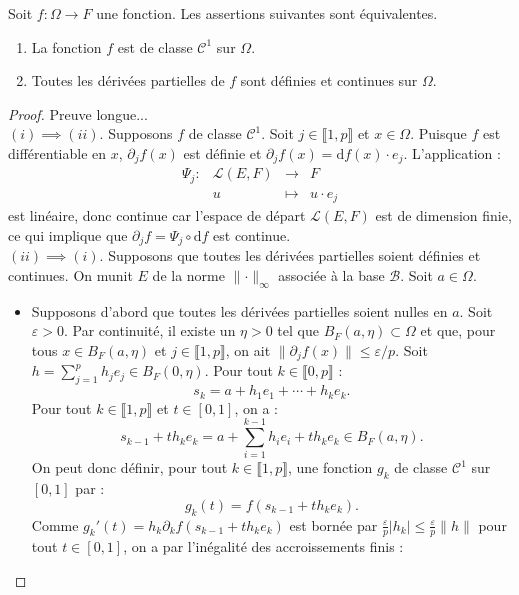 \documentclass[french]{article}
\renewcommand{\d}{\text{d}}
\theoremstyle{plain}
\theoremstyle{definition}
\theoremstyle{remark}
\begin{document}
\begin{thm}%
	Soit $f:\Omega\to F$ une fonction. Les assertions suivantes sont équivalentes.
	\begin{enumerate}[label=(\roman*)]
		\item La fonction $f$ est de classe $\mathcal{C}^1$ sur $\Omega$.
		\item Toutes les dérivées partielles de $f$ sont définies et continues sur $\Omega$.
	\end{enumerate}
\end{thm}
\begin{proof}
	Preuve longue...\\
	$(i)\implies(ii)$.
	Supposons $f$ de classe $\mathcal{C}^1$. Soit $j\in\llbracket1,p\rrbracket$ et $x\in\Omega$. Puisque $f$ est différentiable en $x$, $\partial_jf(x)$ est définie et $\partial_jf(x)=\d f(x)\cdot e_j$. L'application :
	$$\begin{array}{lrcl}
		\Psi_j:&\mathcal{L}(E,F)&\longrightarrow&F\\
		&u&\longmapsto&u\cdot e_j
	\end{array}$$ est linéaire, donc continue car l'espace de départ $\mathcal{L}(E,F)$ est de dimension finie, ce qui implique que $\partial_jf=\Psi_j\circ\d f$ est continue.
	\\
	$(ii)\implies(i)$. Supposons que toutes les dérivées partielles soient définies et continues. On munit $E$ de la norme $\lVert\cdot\rVert_\infty$ associée à la base $\mathcal{B}$. Soit $a\in\Omega$.
	\begin{itemize}
		\item Supposons d'abord que toutes les dérivées partielles soient nulles en $a$. Soit $\varepsilon>0$. Par continuité, il existe un $\eta>0$ tel que $B_F(a,\eta)\subset\Omega$ et que, pour tous $x\in B_F(a,\eta)$ et $j\in\llbracket1,p\rrbracket$, on ait $\lVert\partial_jf(x)\rVert\leqslant\varepsilon/p$. Soit $h=\displaystyle\sum_{j=1}^{p}h_je_j\in B_F(0,\eta)$. Pour tout $k\in\llbracket0,p\rrbracket$ :
		$$s_k=a+h_1e_1+\cdots+h_ke_k.$$ Pour tout $k\in\llbracket1,p\rrbracket$ et $t\in[0,1]$, on a :
		$$s_{k-1}+th_ke_k=a+\sum_{i=1}^{k-1}h_ie_i+th_ke_k\in B_F(a,\eta).$$
		On peut donc définir, pour tout $k\in\llbracket1,p\rrbracket$, une fonction $g_k$ de classe $\mathcal{C}^1$ sur $[0,1]$ par :
		$$g_k(t)=f(s_{k-1}+th_ke_k).$$
		Comme $g_k'(t)=h_k\partial_kf(s_{k-1}+th_ke_k)$ est bornée par $\displaystyle\frac{\varepsilon}{p}\lvert h_k\rvert\leqslant\frac{\varepsilon}{p}\lVert h\rVert$ pour tout $t\in[0,1]$, on a par l'inégalité des accroissements finis :

\end{itemize}
\end{proof}
\end{document}
